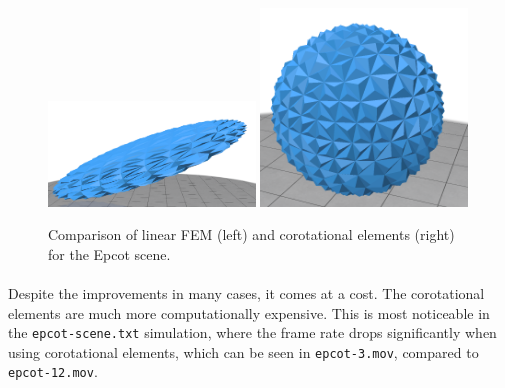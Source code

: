 \documentclass[12pt, a4paper]{article}
\begin{document}
        \begin{figure}[H]
            \centering
            \includegraphics[width=0.49\textwidth]{epcot-12.png}
            \includegraphics[width=0.49\textwidth]{epcot-3.png}
                \caption{Comparison of linear FEM (left) and corotational elements (right) for the Epcot scene.}
                \label{fig:epcot}
        \end{figure}

    \paragraph{}
        Despite the improvements in many cases, it comes at a cost.
        The corotational elements are much more computationally expensive.
        This is most noticeable in the \texttt{epcot-scene.txt} simulation, where the
            frame rate drops significantly when using corotational elements, which can be
            seen in \texttt{epcot-3.mov}, compared to \texttt{epcot-12.mov}.
\end{document}
